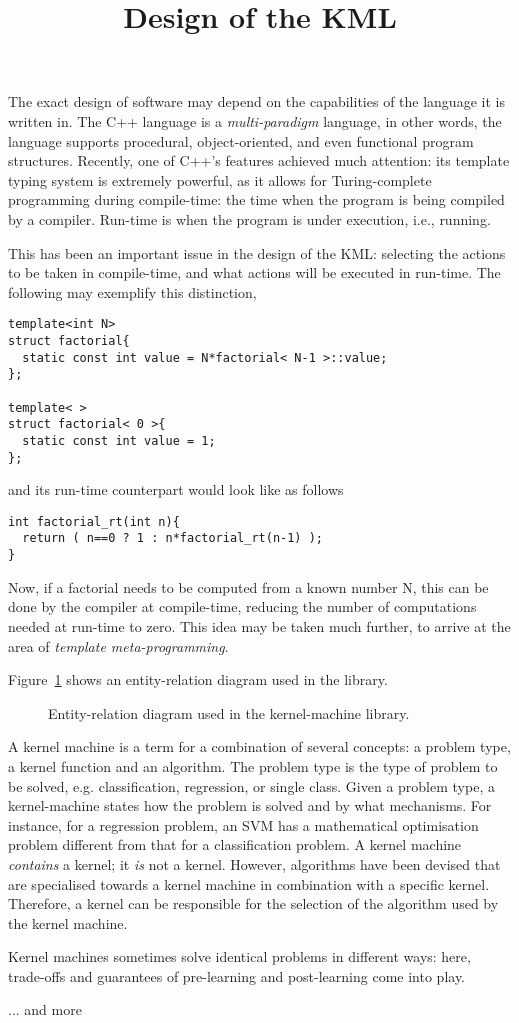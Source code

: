 \documentclass{article}
\begin{document}
\title{Design of the KML}
\maketitle
%
The exact design of software may depend on the capabilities of the language
it is written in. The C++ language is a \emph{multi-paradigm} language,
in other words, the language supports procedural, object-oriented,
and even functional program structures. Recently, one of C++'s features
achieved much attention: its template typing system is extremely powerful,
as it allows for Turing-complete programming during compile-time:
the time when the program is being compiled by a compiler. Run-time
is when the program is under execution, i.e., running. 

This has been an important issue in the design of the KML: selecting 
the actions to be taken in compile-time, and what actions will be executed in
run-time. The following may exemplify this distinction,

\highlightcpp{}
\begin{verbatim}
template<int N>
struct factorial{
  static const int value = N*factorial< N-1 >::value;
};

template< >
struct factorial< 0 >{
  static const int value = 1;
};
\end{verbatim}
and its run-time counterpart would look like as follows

\highlightcpp{}
\begin{verbatim}
int factorial_rt(int n){
  return ( n==0 ? 1 : n*factorial_rt(n-1) );
}
\end{verbatim}
%
Now, if a factorial needs to be computed from a known number N, this
can be done by the compiler at compile-time, reducing the number of
computations needed at run-time to zero. 
%
This idea may be taken much further, to arrive at the area of 
\emph{template meta-programming}.


Figure~\ref{figure:design_kml} shows an entity-relation diagram
used in the library. %
\begin{figure}
%
\caption{Entity-relation diagram used in the kernel-machine library.}
\label{figure:design_kml}
\end{figure}
A kernel machine is a term for a combination of several concepts:
a problem type, a kernel function and an algorithm. The problem type is the
type of problem to be solved, e.g. classification, regression, or
single class. Given a problem type, a kernel-machine states how the
problem is solved and by what mechanisms. For instance, for a regression
problem, an SVM has a mathematical optimisation problem different
from that for a classification problem. A kernel machine \emph{contains}
a kernel; it \emph{is} not a kernel. However, algorithms have been
devised that are specialised towards a kernel machine in combination
with a specific kernel. Therefore, a kernel can be responsible for
the selection of the algorithm used by the kernel machine.

Kernel machines sometimes solve identical problems in different ways:
here, trade-offs and guarantees of pre-learning and post-learning
come into play.


... and more




\end{document}
